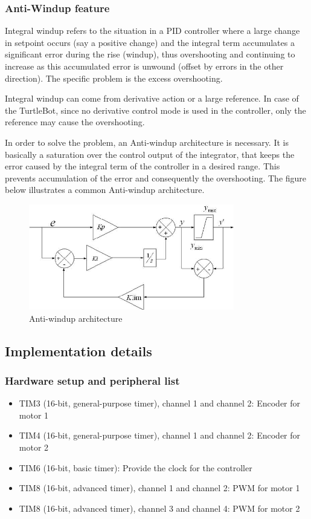\documentclass[english]{article}
\begin{document}
\subsubsection{Anti-Windup feature}
Integral windup refers to the situation in a PID controller where a large change in setpoint occurs (say a positive change) and the integral term accumulates a significant error during the rise (windup), thus overshooting and continuing to increase as this accumulated error is unwound (offset by errors in the other direction). The specific problem is the excess overshooting. 

Integral windup can come from derivative action or a large reference. In case of the TurtleBot, since no derivative control mode is used in the controller, only the reference may cause the overshooting.  

In order to solve the problem, an Anti-windup architecture is necessary. It is basically a saturation over the control output of the integrator, that keeps the error caused by the integral term of the controller in a desired range.  This prevents accumulation of the error and consequently the overshooting. The figure below illustrates a common Anti-windup architecture. 
\begin{figure}[!h]
    \centering
    \includegraphics[width=0.80\textwidth, height=0.25\textheight]{figures/windup.png}
    \caption{Anti-windup architecture}
    \label{fig:pid}
\end{figure}
\subsection{Implementation details}
\subsubsection{Hardware setup and peripheral list}
\begin{itemize}
    \item TIM3 (16-bit, general-purpose timer), channel 1 and channel 2: Encoder for motor 1  
    \item TIM4 (16-bit, general-purpose timer), channel 1 and channel 2: Encoder for motor 2 
    \item TIM6 (16-bit, basic timer): Provide the clock for the controller 
    \item TIM8 (16-bit, advanced timer), channel 1 and channel 2: PWM for motor 1 
    \item TIM8 (16-bit, advanced timer), channel 3 and channel 4: PWM for motor 2 
\end{itemize}
\end{document}
